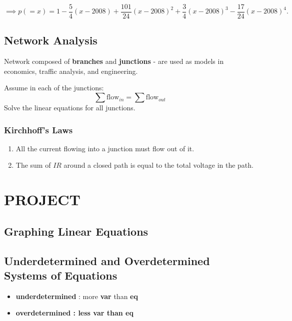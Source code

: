 \documentclass{article}
\begin{document}
    \begin{tcolorbox}
    \[ \implies p(=x) = 1 - \frac{5}{4}(x - 2008)  + \frac{101}{24}(x - 2008)^2 + \frac{3}{4}(x-2008)^3 - \frac{17}{24}(x - 2008)^4.\]
    \end{tcolorbox}

    \subsection*{Network Analysis}
    
    Network composed of \textbf{branches} and \textbf{junctions} - are used as models in economics, traffic analysis, and engineering.

    Assume in each of the junctions: \[ \sum \text{flow}_{in} = \sum \text{flow}_{out}\]
    Solve the linear equations for all junctions.
    
    \subsubsection*{Kirchhoff's Laws}
    \begin{enumerate}
        \item All the current flowing into a junction must flow out of it.
        \item The sum of $IR$  around a closed path is equal to the total voltage in the path.
    \end{enumerate}
    
    \section*{PROJECT}

    \subsection{Graphing Linear Equations}

    \subsection{Underdetermined and Overdetermined Systems of Equations}

    \begin{itemize}
        \item \textbf{underdetermined} : more \textbf{var} than \textbf{eq}
        \item \bf{overdetermined} : less \bf{var} than \bf{eq} 
    \end{itemize}
\end{document}
